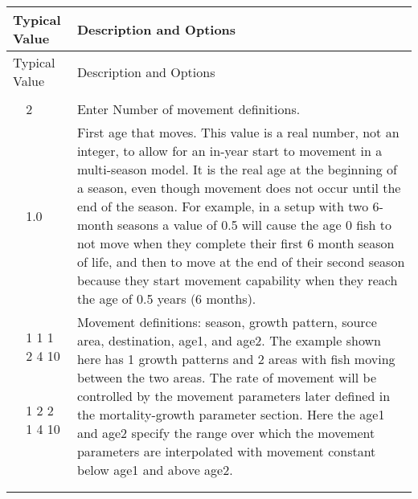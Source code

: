 \begin{longtable}{p{0.5cm} p{2cm} p{12cm}}
	\hline
	\multicolumn{2}{l}{Typical Value} & Description and Options\Tstrut\Bstrut\\
	\hline
	\endfirsthead

	\hline
	\multicolumn{2}{l}{Typical Value} & Description and Options\Tstrut\Bstrut\\
	\hline
	\endhead

	\hline
	\endfoot

	\endlastfoot
	
	\multicolumn{3}{l}{COND:  only if areas > 1}\Tstrut\\ 
	& 2   & Enter Number of movement definitions.\Tstrut\\		
	\Tstrut & 1.0  & First age that moves. This value is a real number, not an integer, to allow for an in-year start to movement in a multi-season model.  It is the real age at the beginning of a season, even though movement does not occur until the end of the season. For example, in a  setup with two 6-month seasons a value of 0.5 will cause the age 0 fish to not move when they complete their first 6 month season of life, and then to move at the end of their second season because they start movement capability when they reach the age of 0.5 years (6 months). \\

	\Tstrut & 1 1 1 2 4 10 & \multicolumn{1}{l}{\multirow{5}{6cm}{\parbox{12cm}{Movement definitions: season, growth pattern, source area, destination, age1, and age2. The example shown here has 1 growth patterns and 2 areas with fish moving between the two areas. The rate of movement will be controlled by the movement parameters later defined in the mortality-growth parameter section.  Here the age1 and age2 specify the range over which the movement parameters are interpolated with movement constant below age1 and above age2.}}}\\
	& 1 2 2 1 4 10 &  \Bstrut\\
	\\
	\\
	\\
	\\ 
	\\
	\hline
	\end{longtable}

